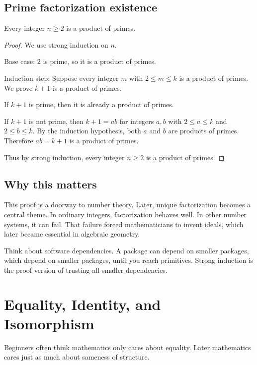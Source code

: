 \documentclass[11pt]{article}
\begin{document}
\subsection{Prime factorization existence}

\begin{theorem}
Every integer $n\geq2$ is a product of primes.
\end{theorem}

\begin{proof}
We use strong induction on $n$.

Base case: $2$ is prime, so it is a product of primes.

Induction step: Suppose every integer $m$ with $2\leq m\leq k$ is a product of primes. We prove $k+1$ is a product of primes.

If $k+1$ is prime, then it is already a product of primes.

If $k+1$ is not prime, then $k+1=ab$ for integers $a,b$ with $2\leq a\leq k$ and $2\leq b\leq k$. By the induction hypothesis, both $a$ and $b$ are products of primes. Therefore $ab=k+1$ is a product of primes.

Thus by strong induction, every integer $n\geq2$ is a product of primes.
\end{proof}

\subsection{Why this matters}

This proof is a doorway to number theory. Later, unique factorization becomes a central theme. In ordinary integers, factorization behaves well. In other number systems, it can fail. That failure forced mathematicians to invent ideals, which later became essential in algebraic geometry.

\begin{walkbox}
Think about software dependencies. A package can depend on smaller packages, which depend on smaller packages, until you reach primitives. Strong induction is the proof version of trusting all smaller dependencies.
\end{walkbox}

\newpage
\section{Equality, Identity, and Isomorphism}

Beginners often think mathematics only cares about equality. Later mathematics cares just as much about sameness of structure.
\end{document}
